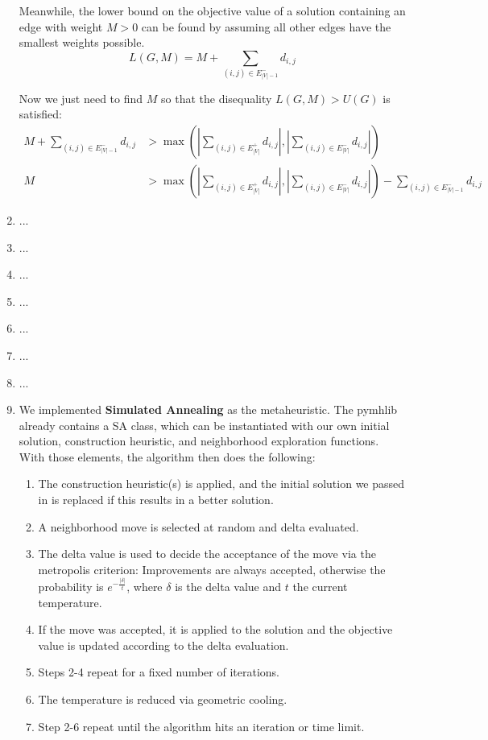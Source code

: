 \documentclass{scrartcl}
\begin{document}
\begin{enumerate}
		Meanwhile, the lower bound on the objective value of a solution containing an edge with weight $M > 0$ can be found by assuming all other edges have the smallest weights possible.
		\[ L(G,M) = M + \sum_{(i,j) \in E_{|V|-1}^-}{d_{i,j}} \]
		
		Now we just need to find $M$ so that the disequality $L(G,M) > U(G)$ is satisfied:
		\begin{align*}
			M + \sum_{(i,j) \in E_{|V|-1}^-}{d_{i,j}} &> \max\left( \left| \sum_{(i,j) \in E_{|V|}^+}{d_{i,j}} \right|, \left| \sum_{(i,j) \in E_{|V|}^-}{d_{i,j}} \right| \right)\\
			M &> \max\left( \left| \sum_{(i,j) \in E_{|V|}^+}{d_{i,j}} \right|, \left| \sum_{(i,j) \in E_{|V|}^-}{d_{i,j}} \right| \right) - \sum_{(i,j) \in E_{|V|-1}^-}{d_{i,j}}
		\end{align*}
		\item ...
		\item ...
		\item ...
		\item ...
		\item ...
		\item ...
		\item ...
		\item We implemented \textbf{Simulated Annealing} as the metaheuristic. The pymhlib already contains a SA class, which can be instantiated with our own initial solution, construction heuristic, and neighborhood exploration functions. With those elements, the algorithm then does the following:
		\begin{enumerate}[\arabic*.]
			\item The construction heuristic(s) is applied, and the initial solution we passed in is replaced if this results in a better solution.
			\item A neighborhood move is selected at random and delta evaluated.
			\item The delta value is used to decide the acceptance of the move via the metropolis criterion: Improvements are always accepted, otherwise the probability is $e^{-\frac{|\delta|}{t}}$, where $\delta$ is the delta value and $t$ the current temperature.
			\item If the move was accepted, it is applied to the solution and the objective value is updated according to the delta evaluation.
			\item Steps 2-4 repeat for a fixed number of iterations.
			\item The temperature is reduced via geometric cooling.
			\item Step 2-6 repeat until the algorithm hits an iteration or time limit.
		\end{enumerate}
	

\end{enumerate}
\end{document}
